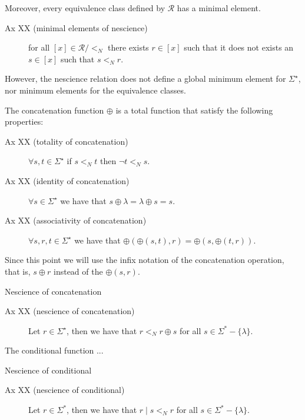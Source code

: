 \vskip 0.25cm

Moreover, every equivalence class defined by $\mathcal{R}$ has a minimal element.

\vskip 0.25cm

\begin{description}
\item[Ax XX (minimal elements of nescience)] for all $[x] \in \mathcal{R} / <_N$ there exists $r \in [x]$ such that it does not exists an $s \in [x]$ such that $s <_N r$.
\end{description}

\vskip 0.25cm

However, the nescience relation does not define a global minimum element for $\Sigma^\star$, nor minimum elements for the equivalence classes.

The concatenation function $\oplus$ is a total function that satisfy the following properties:

\vskip 0.25cm

\begin{description}
\item[Ax XX (totality of concatenation)] $\forall s , t \in \Sigma^\star$ if $s <_N t$ then $\lnot t <_N s$.
\item[Ax XX (identity of concatenation)] $\forall s \in \Sigma^\star$ we have that $s \oplus \lambda = \lambda \oplus s = s$.
\item[Ax XX (associativity of concatenation)] $\forall s, r, t \in \Sigma^\star$ we have that $\oplus(\oplus(s, t), r) = \oplus(s, \oplus(t, r))$.
\end{description}

\vskip 0.25cm

Since this point we will use the infix notation of the concatenation operation, that is, $s \oplus r$ instead of the $\oplus(s, r)$.

Nescience of concatenation

\vskip 0.25cm

\begin{description}
\item[Ax XX (nescience of concatenation)] Let $r \in \Sigma^\star$, then we have that $r <_N r \oplus s$ for all $s \in \Sigma^\ast-\{\lambda\}$.
\end{description}

\vskip 0.25cm

The conditional function ...

Nescience of conditional

\begin{description}
\item[Ax XX (nescience of conditional)] Let $r \in \Sigma^\ast$, then we have that $r \mid s <_N r$ for all $s \in \Sigma^\ast-\{\lambda\}$.
\end{description}

